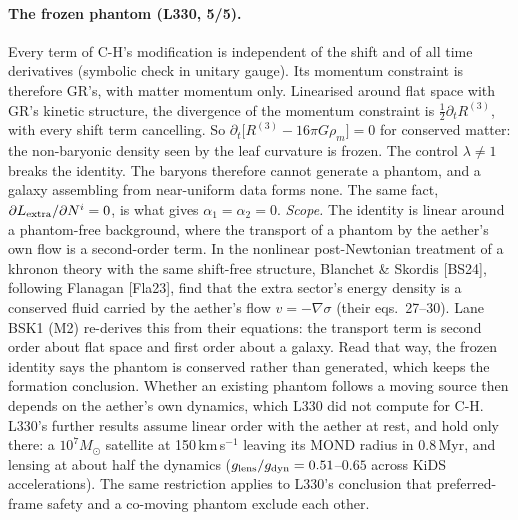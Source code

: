 \documentclass[10pt]{article}
\begin{document}
\paragraph{The frozen phantom (L330, 5/5).}
Every term of C-H's modification is independent of the shift and of all time derivatives (symbolic check in unitary gauge). Its momentum constraint is therefore GR's, with matter momentum only.
Linearised around flat space with GR's kinetic structure, the divergence of the momentum constraint is $\tfrac12\partial_tR^{(3)}$, with every shift term cancelling. So $\partial_t\big[R^{(3)}-16\pi G\rho_m\big]=0$ for conserved matter: the non-baryonic density seen by the leaf curvature is frozen. The control $\lambda\neq1$ breaks the identity.
The baryons therefore cannot generate a phantom, and a galaxy assembling from near-uniform data forms none. The same fact, $\partial L_{\rm extra}/\partial N^i=0$, is what gives $\alpha_1=\alpha_2=0$.
\emph{Scope.} The identity is linear around a phantom-free background, where the transport of a phantom by the aether's own flow is a second-order term. In the nonlinear post-Newtonian treatment of a khronon theory with the same shift-free structure, Blanchet \& Skordis [BS24], following Flanagan [Fla23], find that the extra sector's energy density is a conserved fluid carried by the aether's flow $v=-\nabla\sigma$ (their eqs.~27--30). Lane BSK1 (M2) re-derives this from their equations: the transport term is second order about flat space and first order about a galaxy. Read that way, the frozen identity says the phantom is conserved rather than generated, which keeps the formation conclusion.
Whether an existing phantom follows a moving source then depends on the aether's own dynamics, which L330 did not compute for C-H. L330's further results assume linear order with the aether at rest, and hold only there: a $10^7M_\odot$ satellite at 150\,km\,s$^{-1}$ leaving its MOND radius in 0.8\,Myr, and lensing at about half the dynamics ($g_{\rm lens}/g_{\rm dyn}=0.51$--$0.65$ across KiDS accelerations). The same restriction applies to L330's conclusion that preferred-frame safety and a co-moving phantom exclude each other.
\end{document}
